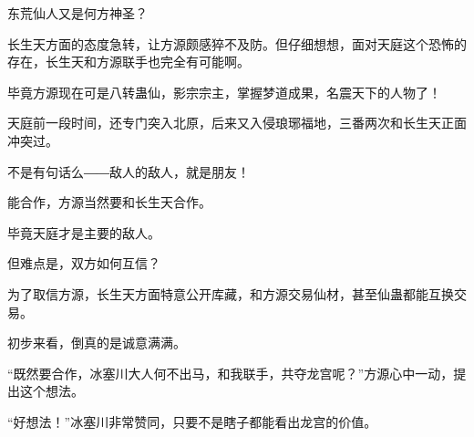 \begin{this_body}
东荒仙人又是何方神圣？

长生天方面的态度急转，让方源颇感猝不及防。但仔细想想，面对天庭这个恐怖的存在，长生天和方源联手也完全有可能啊。

毕竟方源现在可是八转蛊仙，影宗宗主，掌握梦道成果，名震天下的人物了！

天庭前一段时间，还专门突入北原，后来又入侵琅琊福地，三番两次和长生天正面冲突过。

不是有句话么――敌人的敌人，就是朋友！

能合作，方源当然要和长生天合作。

毕竟天庭才是主要的敌人。

但难点是，双方如何互信？

为了取信方源，长生天方面特意公开库藏，和方源交易仙材，甚至仙蛊都能互换交易。

初步来看，倒真的是诚意满满。

“既然要合作，冰塞川大人何不出马，和我联手，共夺龙宫呢？”方源心中一动，提出这个想法。

“好想法！”冰塞川非常赞同，只要不是瞎子都能看出龙宫的价值。

\end{this_body}

